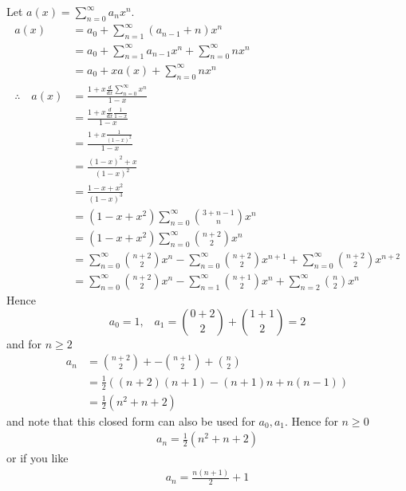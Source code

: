 \newpage
Let $a(x) = \sum_{n=0}^\infty a_n x^n$.
\begin{align*}
a(x) 
&= a_0 + \sum_{n=1}^\infty (a_{n-1} + n) x^n \\
&= a_0 + \sum_{n=1}^\infty a_{n-1} x^n + \sum_{n=0}^\infty n x^n \\
&= a_0 + x a(x) + \sum_{n=0}^\infty n x^n \\
\therefore\,\,\,\,\,\,
a(x) 
&= 
\frac{1 + x\frac{d}{dx} \sum_{n=0}^\infty x^n}{1 - x} \\
&=\frac{1 + x\frac{d}{dx} \frac{1}{1-x} }{1 - x} \\
&=\frac{1 + x \frac{1}{(1-x)^2} }{1 - x} \\
&=\frac{(1-x)^2 + x}{(1 - x)^2} \\
&=\frac{1 - x + x^2}{(1 - x)^3} \\
&=(1 - x + x^2) \sum_{n=0}^\infty \binom{3 + n - 1}{n} x^n \\
&=(1 - x + x^2) \sum_{n=0}^\infty \binom{n + 2}{2} x^n \\
&=
\sum_{n=0}^\infty \binom{n + 2}{2} x^n
- \sum_{n=0}^\infty \binom{n + 2}{2} x^{n+1}
+ \sum_{n=0}^\infty \binom{n + 2}{2} x^{n+2} \\
&=
\sum_{n=0}^\infty \binom{n + 2}{2} x^n
- \sum_{n=1}^\infty \binom{n + 1}{2} x^{n}
+ \sum_{n=2}^\infty \binom{n}{2} x^{n}
\end{align*}
Hence
\[
a_0 = 1, \,\,\,\,\,
a_1 = \binom{0 + 2}{2} + \binom{1 + 1}{2} = 2
\]
and for $n \geq 2$
\begin{align*}
a_n 
&= 
\binom{n + 2}{2} +
- \binom{n + 1}{2}
+ \binom{n}{2} \\
&= \frac{1}{2} 
((n+2)(n+1)
- (n+1)n
+ n(n-1)) \\
&= \frac{1}{2} 
(n^2 
+ n
+ 2)
\end{align*}
and note that this closed form 
can also be used for $a_0, a_1$.
Hence for $n \geq 0$
\begin{align*}
a_n 
= \frac{1}{2}
(n^2 
+ n
+ 2)
\end{align*}
or if you like
\begin{align*}
a_n 
= \frac{n(n+1)}{2} + 1
\end{align*}





  





